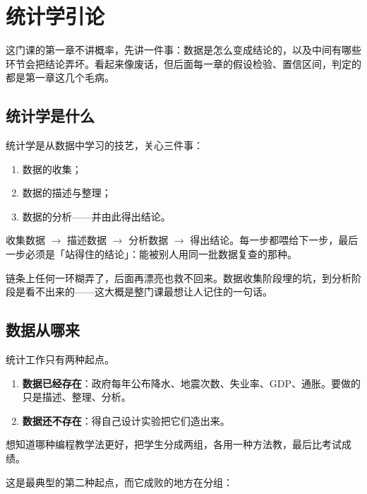 \section{统计学引论}

这门课的第一章不讲概率，先讲一件事：数据是怎么变成结论的，以及中间有哪些环节会把结论弄坏。看起来像废话，但后面每一章的假设检验、置信区间，判定的都是第一章这几个毛病。

\subsection{统计学是什么}

\begin{definition}[统计学]
统计学是从数据中学习的技艺，关心三件事：
\begin{enumerate}
 \item 数据的收集；
 \item 数据的描述与整理；
 \item 数据的分析——并由此得出结论。
\end{enumerate}
\end{definition}

\begin{proposition}[四步是一条单向流水线]
收集数据 $\to$ 描述数据 $\to$ 分析数据 $\to$ 得出结论。每一步都喂给下一步，最后一步必须是「站得住的结论」：能被别人用同一批数据复查的那种。
\end{proposition}

链条上任何一环糊弄了，后面再漂亮也救不回来。数据收集阶段埋的坑，到分析阶段是看不出来的——这大概是整门课最想让人记住的一句话。

\subsection{数据从哪来}

统计工作只有两种起点。

\begin{enumerate}
 \item \textbf{数据已经存在}：政府每年公布降水、地震次数、失业率、GDP、通胀。要做的只是描述、整理、分析。
 \item \textbf{数据还不存在}：得自己设计实验把它们造出来。
\end{enumerate}

\begin{example}[两种教学法]
想知道哪种编程教学法更好，把学生分成两组，各用一种方法教，最后比考试成绩。
\end{example}

这是最典型的第二种起点，而它成败的地方在分组：

